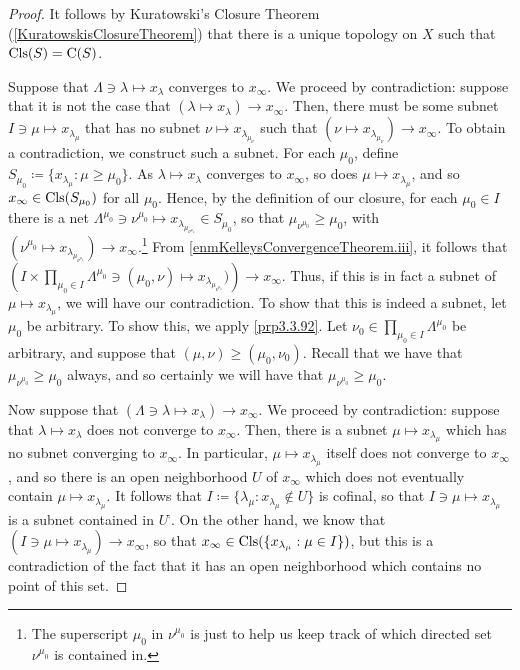 \begin{thm}
\begin{proof}
It follows by Kuratowski's Closure Theorem (\cref{KuratowskisClosureTheorem}) that there is a unique topology on $X$ such that $\operatorname{Cls} (S)=\mathrm{C}(S)$.

Suppose that $\Lambda \ni \lambda \mapsto x_\lambda$ converges to $x_\infty$.  We proceed by contradiction:  suppose that it is not the case that $(\lambda \mapsto x_\lambda )\to x_\infty$.  Then, there must be some subnet $I\ni \mu \mapsto x_{\lambda _\mu}$ that has no subnet $\nu \mapsto x_{\lambda _{\mu _\nu}}$ such that $(\nu \mapsto x_{\lambda _{\mu _\nu}})\to x_\infty$.  To obtain a contradiction, we construct such a subnet.  For each $\mu _0$, define $S_{\mu _0}\coloneqq \{ x_{\lambda _\mu}:\mu \geq \mu _0\}$.  As $\lambda \mapsto x_\lambda$ converges to $x_\infty$, so does $\mu \mapsto x_{\lambda _\mu}$, and so $x_\infty \in \operatorname{Cls} (S_{\mu _0})$ for all $\mu _0$.  Hence, by the definition of our closure, for each $\mu _0\in I$ there is a net $\Lambda ^{\mu _0}\ni \nu ^{\mu _0}\mapsto x_{\lambda _{\mu _{\nu ^{\mu _0}}}}\in S_{\mu _0}$, so that $\mu _{\nu ^{\mu _0}}\geq \mu _0$, with $\left( \nu ^{\mu _0}\mapsto x_{\lambda _{\mu _{\nu ^{\mu _0}}}}\right) \to x_\infty$.\footnote{The superscript $\mu _0$ in $\nu ^{\mu _0}$ is just to help us keep track of which directed set $\nu ^{\mu _0}$ is contained in.}  From \ref{enmKelleysConvergenceTheorem.iii}, it follows that $\left( I\times \prod _{\mu _0\in I}\Lambda ^{\mu _0}\ni (\mu _0,\nu )\mapsto x_{\lambda _{\mu _{\nu ^{\mu _0}}}})\right) \to x_\infty$.  Thus, if this is in fact a subnet of $\mu \mapsto x_{\lambda _\mu}$, we will have our contradiction.  To show that this is indeed a subnet, let $\mu _0$ be arbitrary.  To show this, we apply \cref{prp3.3.92}.  Let $\nu _0\in \prod _{\mu _0\in I}\Lambda ^{\mu _0}$ be arbitrary, and suppose that $(\mu ,\nu )\geq (\mu _0,\nu _0)$.  Recall that we have that $\mu _{\nu ^{\mu _0}}\geq \mu _0$ always, and so certainly we will have that $\mu _{\nu ^{\mu _0}}\geq \mu _0$. 

Now suppose that $(\Lambda \ni \lambda \mapsto x_\lambda )\to x_\infty$.  We proceed by contradiction:  suppose that $\lambda \mapsto x_\lambda$ does not converge to $x_\infty$.  Then, there is a subnet $\mu \mapsto x_{\lambda _\mu}$ which has no subnet converging to $x_\infty$.  In particular, $\mu \mapsto x_{\lambda _\mu}$ itself does not converge to $x_\infty$, and so there is an open neighborhood $U$ of $x_\infty$ which does not eventually contain $\mu \mapsto x_{\lambda _\mu}$.  It follows that $I\coloneqq \{ \lambda _\mu :x_{\lambda _\mu}\notin U\}$ is cofinal, so that $I\ni \mu \mapsto x_{\lambda _\mu}$ is a subnet contained in $U^{\comp}$.  On the other hand, we know that $(I\ni \mu \mapsto x_{\lambda _\mu})\to x_\infty$, so that $x_\infty \in \operatorname{Cls} (\{ x_{\lambda _\mu}:\mu \in I\})$, but this is a contradiction of the fact that it has an open neighborhood which contains no point of this set.


\end{proof}
\end{thm}
